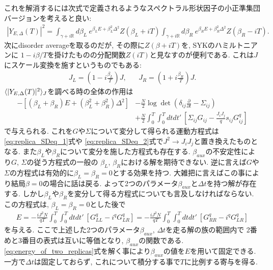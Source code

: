 これを解消するには次式で定義されるようなスペクトラル形状因子の小正準集団バージョンを考えると良い:
\begin{align}
	|Y_{E, \Delta}(T)|^2
	= \int_{\gamma + i\mathbb{R}}d\beta_L\ e^{\beta_LE + \beta_L^2\Delta^2}Z(\beta_L + iT)
	\int_{\gamma + i\mathbb{R}}d\beta_R\ e^{\beta_RE + \beta_R^2\Delta^2}Z(\beta_R - iT).
\end{align}
次にdisorder averageを取るのだが, その際に$Z(\beta + iT)$を, SYKのハミルトニアンに
$1 - i\beta / T$を掛けたものの分配関数$Z(iT)$と見なすのが便利である. 
これは$J$にスケール変換を施すというものでもある:
\begin{align}
	J_L = \left(1 - i\frac{\beta_L}{T}\right)J,\hspace{20pt}
	J_R = \left(1 + i\frac{\beta_R}{T}\right)J.
\end{align}
$\langle |Y_{E,\Delta}(T)|^2 \rangle_J$を調べる時の全体の作用は
\begin{align}
	-\left[(\beta_L + \beta_R)E + (\beta_L^2 + \beta_R^2)\Delta^2\right]
	&-\frac{N}{2}\log\det\left(\delta_{ij}\frac{\partial}{\partial t}
	- \Sigma_{ij}\right)\nonumber\\
	&+\frac{N}{2}\int_0^T\int_0^T dtdt'\ 
		\left[\Sigma_{ij}G_{ij} - \frac{J_iJ_j}{q}s_{ij}G_{ij}^q\right]
\end{align}
で与えられる. 
これを$G$や$\Sigma$について変分して得られる運動方程式は\eqref{eq:replica_SDeq_1}式や
\eqref{eq:replica_SDeq_2}式で$J^2\to J_iJ_j$と置き換えたものとなる. 
また$\beta_L$や$\beta_R$について変分を施した方程式も存在する. 
$\beta_{aux}$の不安定性により$G$, $\Sigma$の従う方程式の一般の
$\beta_L$, $\beta_R$における解を期待できない. 
逆に言えば$G$や$\Sigma$の方程式は有効的に$\beta_L = \beta_R = 0$とする効果を持つ. 
大雑把に言えばこの事により結局$\beta = 0$の場合に話は戻る. 
よって2つのパラメータ$\beta_{aux}$と$\Delta t$を持つ解が存在する. 
しかし$\beta_L$や$\beta_R$を変分して得る方程式についても言及しなければならない. 
この方程式は, $\beta_L = \beta_R = 0$とした後で
\begin{align}
	E
	= -\frac{iJ^2N}{qT}\int_0^T\int_0^T dtdt'\ [G_{LL}^q - i^qG_{LR}^q]
	= -\frac{iJ^2N}{qT}\int_0^T\int_0^T dtdt'\ [G_{RR}^q - i^qG_{LR}^q]
	\label{eq:energy_of_two_replicas}
\end{align}
を与える. ここで上述した2つのパラメータ$\beta_{aux}$, $\Delta t$を走る解の族の範囲内で
2番めと3番目の表式は互いに等価となり, $\beta_{aux}$の関数である. 
\eqref{eq:energy_of_two_replicas}式を解く事により$\beta_{aux}$の値を$E$を用いて固定できる. 
一方で$\Delta t$は固定しておらず, これについて積分する事で$T$に比例する寄与を得る. 

\pagebreak
